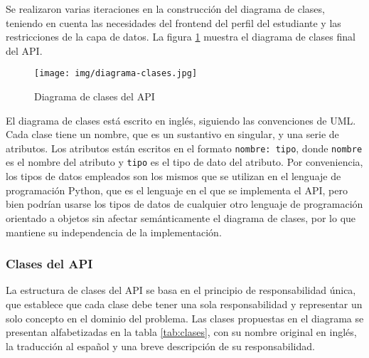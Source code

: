 Se realizaron varias iteraciones en la construcción del diagrama de clases, teniendo en cuenta las necesidades del \gls{frontend} del perfil del estudiante y las restricciones de la capa de datos. La figura \ref{fig:diagrama_clases} muestra el diagrama de clases final del \gls{API}.

\begin{figure}[h]
	\centering
	\texttt{[image: img/diagrama-clases.jpg]}
	\caption{Diagrama de clases del \gls{API}}
	\label{fig:diagrama_clases}
\end{figure}

El diagrama de clases está escrito en inglés, siguiendo las convenciones de \gls{UML}. Cada clase tiene un nombre, que es un sustantivo en singular, y una serie de atributos. Los atributos están escritos en el formato \texttt{nombre: tipo}, donde \texttt{nombre} es el nombre del atributo y \texttt{tipo} es el tipo de dato del atributo. Por conveniencia, los tipos de datos empleados son los mismos que se utilizan en el lenguaje de programación \gls{Python}, que es el lenguaje en el que se implementa el \gls{API}, pero bien podrían usarse los tipos de datos de cualquier otro lenguaje de programación orientado a objetos sin afectar semánticamente el diagrama de clases, por lo que mantiene su independencia de la implementación.

\subsubsection{Clases del API}

La estructura de clases del \gls{API} se basa en el principio de responsabilidad única, que establece que cada clase debe tener una sola responsabilidad y representar un solo concepto en el dominio del problema. Las clases propuestas en el diagrama se presentan alfabetizadas en la tabla \ref{tab:clases}, con su nombre original en inglés, la traducción al español y una breve descripción de su responsabilidad.


